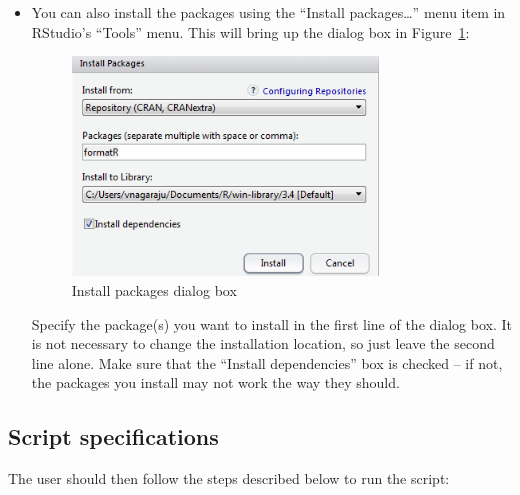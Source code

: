 \documentclass[journal]{IEEEtran}
\begin{document}
\begin{itemize}
{\begin{itemize}
{\begin{itemize}
        \end{itemize}
        }
        \item {You can also install the packages using the “Install packages…” menu item in RStudio’s “Tools” menu. This will bring up the dialog box in Figure~\ref{fig:InstallPackages}:
        \begin{figure}[!h]
        \centering
        \includegraphics[width=3.2in]{Figures/InstallPackages}
        \caption{Install packages dialog box}
        \label{fig:InstallPackages}
        \end{figure}
        
        \noindent Specify the package(s) you want to install in the first line of the dialog box. It is not necessary to change the installation location, so just leave the second line alone. Make sure that the ``Install dependencies'' box is checked – if not, the packages you install may not work the way they should.
        }
      \end{itemize}
      }
\end{itemize}

\subsection{Script specifications}\label{sec:ScriptRun}
The user should then follow the steps described below to run the script:
\end{document}
